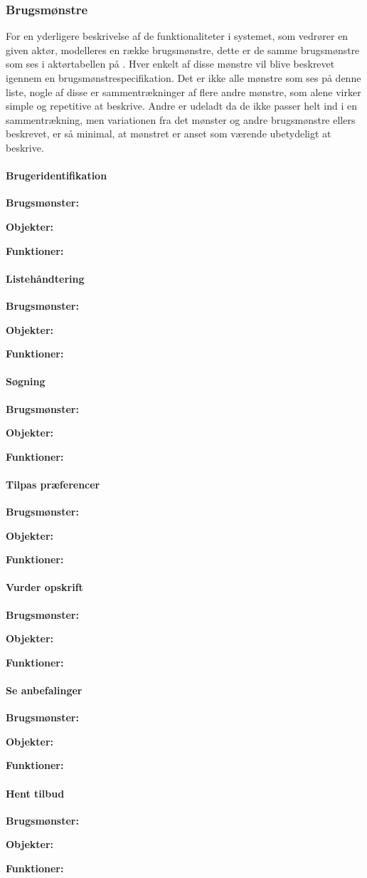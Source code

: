 \subsubsection*{Brugsmønstre}
For en yderligere beskrivelse af de funktionaliteter i systemet, som vedrører en given aktør, modelleres en række brugsmønstre, dette er de samme brugsmønstre som ses i aktørtabellen på . 
Hver enkelt af disse mønstre vil blive beskrevet igennem en brugsmønstrespecifikation. 
Det er ikke alle mønstre som ses på denne liste, nogle af disse er sammentrækninger af flere andre mønstre, som alene virker simple og repetitive at beskrive. 
Andre er udeladt da de ikke passer helt ind i en sammentrækning, men variationen fra det mønster og andre brugsmønstre ellers beskrevet, er så minimal, at mønstret er anset som værende ubetydeligt at beskrive.

\paragraph*{Brugeridentifikation}
\textbf{Brugsmønster:}

\textbf{Objekter:}

\textbf{Funktioner:}

\paragraph*{Listehåndtering}
\textbf{Brugsmønster:}

\textbf{Objekter:}

\textbf{Funktioner:}

\paragraph*{Søgning}
\textbf{Brugsmønster:}

\textbf{Objekter:}

\textbf{Funktioner:}

\paragraph*{Tilpas præferencer}
\textbf{Brugsmønster:}

\textbf{Objekter:}

\textbf{Funktioner:}

\paragraph*{Vurder opskrift}
\textbf{Brugsmønster:}

\textbf{Objekter:}

\textbf{Funktioner:}

\paragraph*{Se anbefalinger}
\textbf{Brugsmønster:}

\textbf{Objekter:}

\textbf{Funktioner:}

\paragraph*{Hent tilbud}
\textbf{Brugsmønster:}

\textbf{Objekter:}

\textbf{Funktioner:}
